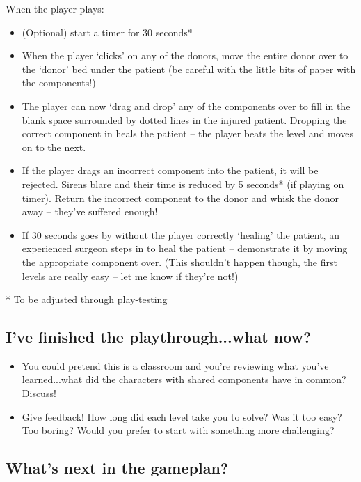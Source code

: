 \documentclass{article}
\begin{document}
\newpage

When the player plays:
\begin{itemize}
  \item (Optional) start a timer for 30 seconds*
  \item When the player `clicks' on any of the donors, move the entire donor over to the `donor' bed under the patient (be careful with the little bits of paper with the components!)
  \item The player can now `drag and drop' any of the components over to fill in the blank space surrounded by dotted lines in the injured patient. Dropping the correct component in heals the patient -- the player beats the level and moves on to the next.
  \item If the player drags an incorrect component into the patient, it will be rejected. Sirens blare and their time is reduced by 5 seconds* (if playing on timer). Return the incorrect component to the donor and whisk the donor away -- they've suffered enough!
  \item If 30 seconds goes by without the player correctly `healing' the patient, an experienced surgeon steps in to heal the patient -- demonstrate it by moving the appropriate component over. (This shouldn't happen though, the first levels are really easy -- let me know if they're not!)
\end{itemize}

* To be adjusted through play-testing

\newpage

\setcounter{page}{9}

\subsection*{I've finished the playthrough...what now?}

\begin{itemize}
  \item You could pretend this is a classroom and you're reviewing what you've learned...what did the characters with shared components have in common? Discuss!
  \item Give feedback! How long did each level take you to solve? Was it too easy? Too boring? Would you prefer to start with something more challenging?  
\end{itemize}

\subsection*{What's next in the gameplan?}
\end{document}
